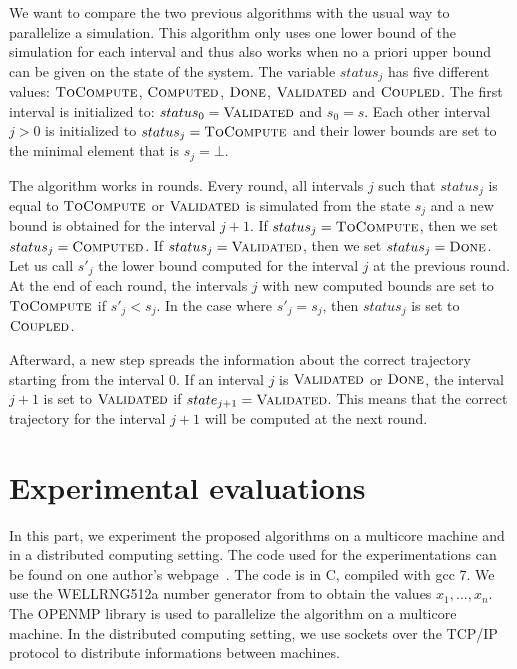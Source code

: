 \documentclass[a4paper,10pt]{article}
\begin{document}
We want to compare the two previous algorithms with the usual way to parallelize a simulation. 
This algorithm only uses one lower bound of the simulation for each interval and thus also works when no a priori upper bound can be given on the state of the system. The variable $status_j$ has five different values:  $\textsc{ToCompute}$,  $\textsc{Computed}$,  $\textsc{Done}$,  $\textsc{Validated}$ and $\textsc{Coupled}$.
The first interval is initialized to: $status_0 = \textsc{Validated}$ and $s_0 = s$.
Each other interval $j>0$ is initialized to $status_j = \textsc{ToCompute}$ and their lower bounds are set to the minimal element that is  $s_j = \bot$. 

The algorithm works in rounds. Every round, all intervals $j$ such that $status_j$ is equal to $\textsc{ToCompute}$ or $\textsc{Validated}$ is simulated from the state $s_j$ and a new bound is obtained for the interval $j+1$. If $status_j = \textsc{ToCompute}$, then  we set $status_j = \textsc{Computed}$. If $status_j = \textsc{Validated}$, then  we set $status_j = \textsc{Done}$.
 Let us call $s'_j$ the lower bound computed for the interval $j$ at the previous round. At the end of each round, the intervals $j$ with new computed bounds are set to $\textsc{ToCompute}$ if $s'_j < s_j$. In the case where $s'_j = s_j$, then $status_j$ is set to $\textsc{Coupled}$. 
 
Afterward, a new step spreads the information about the correct trajectory starting from the interval $0$. If an interval $j$ is $\textsc{Validated}$ or $\textsc{Done}$, the interval $j+1$ is set to $ \textsc{Validated}$ if $state_{j+1} = \textsc{Validated}$. This means that the correct trajectory for the interval $j+1$ will be computed at the next round.

\section{Experimental evaluations}\label{sec:expertiments}

In this part, we experiment the proposed algorithms on a multicore machine and in a distributed computing setting. The code used for the experimentations can be found on one author's webpage~\cite{webpage}. The code is in C, compiled with gcc 7.
We use the WELLRNG512a number generator from \cite{panneton2006improved} to obtain the values $x_1,\dots,x_n$. 
The OPENMP library is used to parallelize the algorithm on a multicore machine. 
In the distributed computing setting, we use sockets over the TCP/IP protocol to distribute informations between machines.
\end{document}
